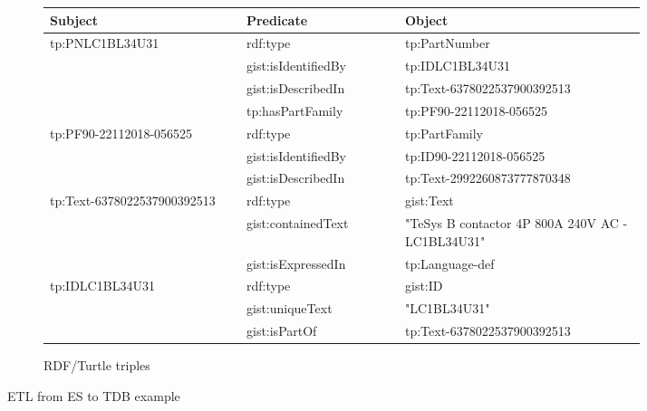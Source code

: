 \begin{figure}[H]
\begin{subfigure}{\textwidth}
  \begin{table}[H]
	  \begin{tabular}{|p{0.31\linewidth}|p{0.25\linewidth}|p{0.38\linewidth}|}
		  \hline
		  \textbf{Subject} & \textbf{Predicate} & \textbf{Object} \\
		  \hline
		  \multirow{4}{*}{tp:PNLC1BL34U31} & rdf:type & tp:PartNumber \\
		   & gist:isIdentifiedBy & tp:IDLC1BL34U31 \\
		   & gist:isDescribedIn & tp:Text-6378022537900392513 \\
		   & tp:hasPartFamily & tp:PF90-22112018-056525 \\
		  \hline
		  \multirow{3}{*}{tp:PF90-22112018-056525} & rdf:type & tp:PartFamily \\
		   & gist:isIdentifiedBy & tp:ID90-22112018-056525 \\
		   & gist:isDescribedIn & tp:Text-2992260873777870348 \\
		  \hline
		  \multirow{3}{*}{tp:Text-6378022537900392513} & rdf:type & gist:Text \\
		   & gist:containedText & "TeSys B contactor 4P 800A 240V AC - LC1BL34U31" \\
		   & gist:isExpressedIn & tp:Language-def \\
		  \hline
		  \multirow{3}{*}{tp:IDLC1BL34U31} & rdf:type & gist:ID \\
		   & gist:uniqueText & "LC1BL34U31" \\
		   & gist:isPartOf & tp:Text-6378022537900392513 \\
		  \hline
	  \end{tabular}
  \end{table}

  \caption{RDF/Turtle triples}
  \label{fig:rdf_ttl_example}
\end{subfigure}
\caption{ETL from ES to TDB example}
\label{fig:etl-1_example}
\end{figure}

